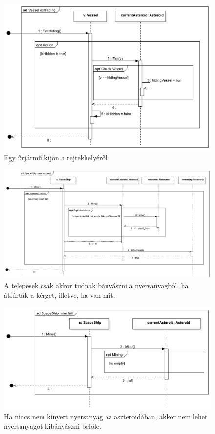 \begin{figure}[H] 
\centering 
\includegraphics[width=1\textwidth]{docs/3_Project/svg/Design Model!Vessel Actions!Vessel exitHiding!Vessel exitHiding_12.png} 
\caption{Egy űrjármű kijön a rejtekhelyéről.} 
\end{figure} 

\begin{figure}[H] 
\centering 
\includegraphics[width=1\textwidth]{docs/3_Project/svg/Design Model!Vessel Actions!SpaceShip mine succeed!SpaceShip mine succeed_13.png} 
\caption{A telepesek csak akkor tudnak bányászni a nyersanyagból, ha átfúrták a kérget, illetve, ha van mit.} 
\end{figure} 

\begin{figure}[H] 
\centering 
\includegraphics[width=1\textwidth]{docs/3_Project/svg/Design Model!Vessel Actions!SpaceShip mine fail!SpaceShip mine fail_14.png} 
\caption{Ha nincs nem kinyert nyersanyag az aszteroidában, akkor nem lehet nyersanyagot kibányászni belőle.} 
\end{figure} 


